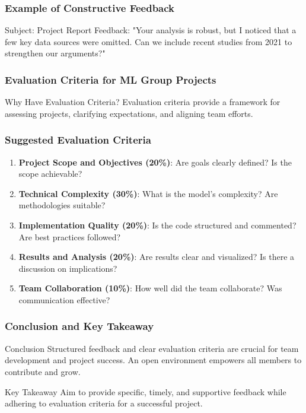 \documentclass[aspectratio=169]{beamer}
\begin{document}
\begin{frame}[fragile]
    \frametitle{Example of Constructive Feedback}
    \begin{block}{Subject: Project Report}
        Feedback: "Your analysis is robust, but I noticed that a few key data sources were omitted. Can we include recent studies from 2021 to strengthen our arguments?"
    \end{block}
\end{frame}

\begin{frame}[fragile]
    \frametitle{Evaluation Criteria for ML Group Projects}
    \begin{block}{Why Have Evaluation Criteria?}
        Evaluation criteria provide a framework for assessing projects, clarifying expectations, and aligning team efforts.
    \end{block}
\end{frame}

\begin{frame}[fragile]
    \frametitle{Suggested Evaluation Criteria}
    \begin{enumerate}
        \item \textbf{Project Scope and Objectives (20\%)}: Are goals clearly defined? Is the scope achievable?
        \item \textbf{Technical Complexity (30\%)}: What is the model's complexity? Are methodologies suitable?
        \item \textbf{Implementation Quality (20\%)}: Is the code structured and commented? Are best practices followed?
        \item \textbf{Results and Analysis (20\%)}: Are results clear and visualized? Is there a discussion on implications?
        \item \textbf{Team Collaboration (10\%)}: How well did the team collaborate? Was communication effective?
    \end{enumerate}
\end{frame}

\begin{frame}[fragile]
    \frametitle{Conclusion and Key Takeaway}
    \begin{block}{Conclusion}
        Structured feedback and clear evaluation criteria are crucial for team development and project success. An open environment empowers all members to contribute and grow.
    \end{block}
    \begin{block}{Key Takeaway}
        Aim to provide specific, timely, and supportive feedback while adhering to evaluation criteria for a successful project.
    \end{block}
\end{frame}
\end{document}

